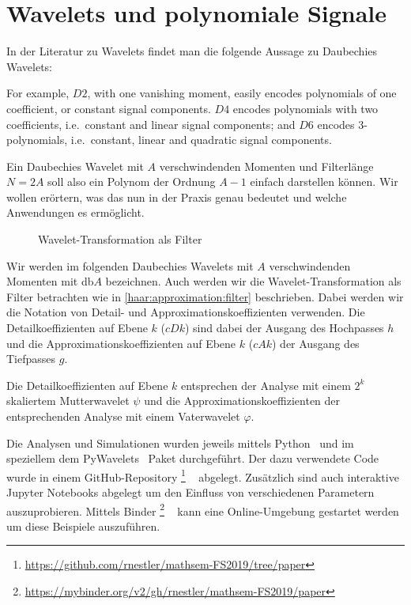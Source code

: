 %
%
%
\chapter{Wavelets und polynomiale Signale\label{chapter:thema}}
\begin{refsection}

In der Literatur zu Wavelets findet man die folgende Aussage zu Daubechies
Wavelets:
\begin{displayquote}
For example, $D2$, with one vanishing moment, easily encodes polynomials of one
coefficient, or constant signal components. $D4$ encodes polynomials with two
coefficients, i.e.\ constant and linear signal components; and $D6$ encodes
3-polynomials, i.e.\ constant, linear and quadratic signal components.
\end{displayquote}
Ein Daubechies Wavelet mit $A$ verschwindenden Momenten und Filterlänge $N=2A$
soll also ein Polynom der Ordnung $A-1$ einfach darstellen können. Wir wollen
erörtern, was das nun in der Praxis genau bedeutet und welche Anwendungen es
ermöglicht.

\begin{figure}
    \centering
    
    \caption{Wavelet-Transformation als Filter\label{polynomials:filter}}
\end{figure}

Wir werden im folgenden Daubechies Wavelets mit $A$ verschwindenden Momenten
mit db$A$ bezeichnen. Auch werden wir die Wavelet-Transformation als Filter
betrachten wie in \autoref{haar:approximation:filter} beschrieben. Dabei werden
wir die Notation von Detail- und Approximationskoeffizienten verwenden. Die
Detailkoeffizienten auf Ebene $k$ ($cDk$) sind dabei der Ausgang des Hochpasses
$h$ und die Approximationskoeffizienten auf Ebene $k$ ($cAk$) der Ausgang des
Tiefpasses $g$.

Die Detailkoeffizienten auf Ebene $k$ entsprechen der Analyse mit einem $2^k$
skaliertem Mutterwavelet $\psi$ und die Approximationskoeffizienten der
entsprechenden Analyse mit einem Vaterwavelet $\varphi$.

Die Analysen und Simulationen wurden jeweils mittels Python~\cite{python} und im
speziellem dem PyWavelets~\cite{gregory_r_lee_2019_2634243} Paket durchgeführt.
Der dazu verwendete Code wurde in einem GitHub-Repository%
\footnote{\url{https://github.com/rnestler/mathsem-FS2019/tree/paper}}%
~\cite{polynomials:repo}
abgelegt. Zusätzlich sind auch interaktive Jupyter Notebooks abgelegt um den
Einfluss von verschiedenen Parametern auszuprobieren. Mittels
Binder%
\footnote{\url{https://mybinder.org/v2/gh/rnestler/mathsem-FS2019/paper}}%
~\cite{project_jupyter-proc-scipy-2018}
kann eine Online-Umgebung gestartet werden um diese Beispiele auszuführen.


\end{refsection}
